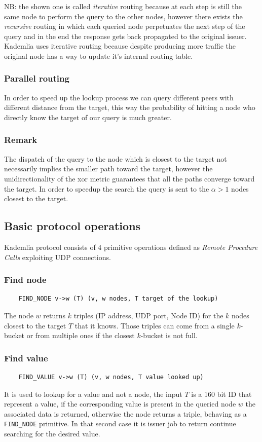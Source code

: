 NB: the shown one is called \emph{iterative} routing because at each step is still the same node to perform the query to the other nodes, however there exists the \emph{recursive} routing in which each queried node perpetuates the next step of the query and in the end the response gets back propagated to the original issuer.
Kademlia uses iterative routing because despite producing more traffic the original node has a way to update it's internal routing table.

\subsubsection{Parallel routing}
In order to speed up the lookup process we can query different peers with different distance from the target, this way the probability of  hitting a node who directly know the target of our query is much greater.

\subsubsection{Remark}
The dispatch of the query to the node which is closest to the target not necessarily implies the smaller path toward the target, however the unidirectionality of the xor metric guarantees that all the paths converge toward the target.
In order to speedup the search the query is sent to the $\alpha > 1$ nodes closest to the target.

\subsection{Basic protocol operations}
Kademlia protocol consists of 4 primitive operations defined as \emph{Remote Procedure Calls} exploiting UDP connections.

\subsubsection{Find node}
\begin{verbatim}
    FIND_NODE v->w (T) (v, w nodes, T target of the lookup)
\end{verbatim}
The node $w$ returns $k$ triples (IP address, UDP port, Node ID) for the $k$ nodes closest to the target $T$ that it knows.
Those triples can come from a single $k$-bucket or from multiple ones if the closest $k$-bucket is not full.

\subsubsection{Find value}
\begin{verbatim}
    FIND_VALUE v->w (T) (v, w nodes, T value looked up)
\end{verbatim}
It is used to lookup for a value and not a node, the input $T$ is a 160 bit ID that represent a value, if the corresponding value is present in the queried node $w$ the associated data is returned, otherwise the node returns a triple, behaving as a \verb|FIND_NODE| primitive.
In that second case it is issuer job to return continue searching for the desired value.


